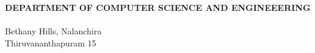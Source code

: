 \begin{titlepage}
\begin{center}
 \begin{figure}[ht]
 \begin{center}
 \end{center}
 \end{figure}

{\sf \textbf{\textcolor[rgb]{0,0,0}{DEPARTMENT OF COMPUTER SCIENCE AND ENGINEEERING}}}\\[0.5ex]
{\sf {\textcolor[rgb]{0,0,0}{MAR BASELIOS COLLEGE OF ENGINEERING \& TECHNOLOGY}}}\\[0.4ex]
Bethany Hills, Nalanchira\\
{\sf \textcolor[rgb]{0,0,0}{Thiruvananthapuram 15}}\\[0.5ex]

\end{center}
\end{titlepage}
